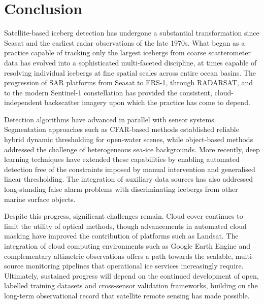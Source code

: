 \documentclass[11pt, letterpaper]{article}
\begin{document}
\section{Conclusion}

Satellite-based iceberg detection has undergone a substantial transformation 
since Seasat and the earliest radar observations of the late 1970s. What 
began as a practice capable of tracking only the largest icebergs from coarse 
scatterometer data has evolved into a sophisticated multi-faceted discipline, 
at times capable of resolving individual icebergs at fine spatial scales 
across entire ocean basins. The progression of SAR platforms from Seasat to 
ERS-1, through RADARSAT, and to the modern Sentinel-1 constellation has 
provided the consistent, cloud-independent backscatter imagery upon which 
the practice has come to depend.

Detection algorithms have advanced in parallel with sensor systems. 
Segmentation approaches such as CFAR-based methods established reliable hybrid
dynamic thresholding for open-water scenes, \parencite{karvonen_etal_2021} 
while object-based methods addressed the challenge of heterogeneous sea-ice 
backgrounds. \parencite{mazur_amundsen_2017, silva_bigg_2005} More recently, 
deep learning techniques have extended these capabilities by enabling 
automated detection free of the constraints imposed by manual intervention 
and generalised linear thresholding. \parencite{braakmann_folgmann_etal_2023, 
evans_etal_2023, barbat_etal_2021} The integration of auxiliary data 
sources has also addressed long-standing false alarm problems with discriminating icebergs from other marine surface objects. \parencite{heiselberg_etal_2022}

Despite this progress, significant challenges remain. Cloud cover continues 
to limit the utility of optical methods, though advancements in automated cloud 
masking have improved the contribution of platforms such as Landsat. 
\parencite{scheick_etal_2019} The integration of cloud computing 
environments such as Google Earth Engine \parencite{koo_etal_2021} and 
complementary altimetric observations offers a path towards the scalable, 
multi-source monitoring pipelines that operational ice services increasingly 
require. Ultimately, sustained progress will depend on the continued 
development of open, labelled training datasets and cross-sensor validation 
frameworks, building on the long-term observational record that satellite 
remote sensing has made possible. \parencite{long_icebergs_2002}

\printbibliography
 
\end{document}

